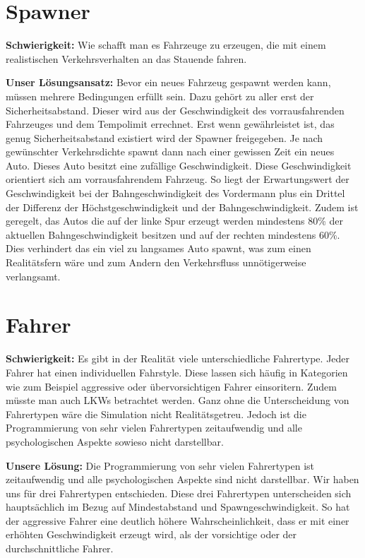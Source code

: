 \section{Spawner}
\textbf{Schwierigkeit:} Wie schafft man es Fahrzeuge zu erzeugen, die mit einem realistischen Verkehrsverhalten an das Stauende fahren.
\begin{addmargin}[25pt]{0pt}
	\item \textbf{Unser Lösungsansatz:} Bevor ein neues Fahrzeug gespawnt werden kann, müssen mehrere Bedingungen erfüllt sein. Dazu gehört zu aller erst der Sicherheitsabstand. Dieser wird aus der Geschwindigkeit des vorrausfahrenden Fahrzeuges und dem Tempolimit errechnet. Erst wenn gewährleistet ist, das genug Sicherheitsabstand existiert wird der Spawner freigegeben. Je nach gewünschter Verkehrsdichte spawnt dann nach einer gewissen Zeit ein neues Auto. Dieses Auto besitzt eine zufällige Geschwindigkeit. Diese Geschwindigkeit orientiert sich am vorrausfahrendem Fahrzeug. So liegt der Erwartungswert der Geschwindigkeit bei der Bahngeschwindigkeit des Vordermann plus ein Drittel der Differenz der Höchstgeschwindigkeit und der Bahngeschwindigkeit. Zudem ist geregelt, das Autos die auf der linke Spur erzeugt werden mindestens 80\% der aktuellen Bahngeschwindigkeit besitzen und auf der rechten mindestens 60\%. Dies verhindert das ein viel zu langsames Auto spawnt, was zum einen Realitätsfern wäre und zum Andern den Verkehrsfluss unnötigerweise verlangsamt.\\
\end{addmargin}

\section{Fahrer}
\textbf{Schwierigkeit:} Es gibt in der Realität viele unterschiedliche Fahrertype. Jeder Fahrer hat einen individuellen Fahrstyle. Diese lassen sich häufig in Kategorien wie zum Beispiel aggressive oder übervorsichtigen Fahrer einsoritern. Zudem müsste man auch LKWs betrachtet werden. Ganz ohne die Unterscheidung von Fahrertypen wäre die Simulation nicht Realitätsgetreu. Jedoch ist die Programmierung von sehr vielen Fahrertypen zeitaufwendig und alle psychologischen Aspekte sowieso nicht darstellbar.
\begin{addmargin}[25pt]{0pt}
	\item \textbf{Unsere Lösung:} Die Programmierung von sehr vielen Fahrertypen ist zeitaufwendig und alle psychologischen Aspekte sind nicht darstellbar. Wir haben uns für drei Fahrertypen entschieden. Diese drei Fahrertypen unterscheiden sich hauptsächlich im Bezug auf Mindestabstand und Spawngeschwindigkeit. So hat der aggressive Fahrer eine deutlich höhere Wahrscheinlichkeit, dass er mit einer erhöhten Geschwindigkeit erzeugt wird, als der vorsichtige oder der durchschnittliche Fahrer.\\
\end{addmargin}